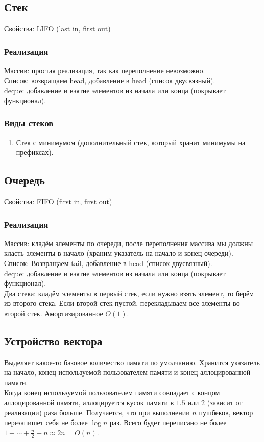 \documentclass[12pt, a4paper]{article}
\begin{document}
    \subsection{Стек}
        Свойства: LIFO (last in, first out)
        \subsubsection*{Реализация}
        Массив: простая реализация, так как переполнение невозможно.\\
        Список: возвращаем head, добавление в head (список двусвязный).\\
        deque: добавление и взятие элементов из начала или конца (покрывает функционал).
        \subsubsection*{Виды стеков}
        \begin{enumerate}
            \item Стек с минимумом (дополнительный стек, который хранит минимумы на префиксах).
        \end{enumerate}
    \subsection{Очередь}
        Свойства: FIFO (first in, first out)
        \subsubsection*{Реализация}
        Массив: кладём элементы по очереди, после переполнения массива мы должны класть элементы в начало (храним указатель на начало и конец очереди).\\
        Список: Возвращаем tail, добавление в head (список двусвязный).\\
        deque: добавление и взятие элементов из начала или конца (покрывает функционал).\\
        Два стека: кладём элементы в первый стек, если нужно взять элемент, то берём из второго стека. Если второй стек пустой, перекладываем все элементы во второй стек. Амортизированное $O (1)$.
    \subsection{Устройство вектора}
        Выделяет какое-то базовое количество памяти по умолчанию. Хранится указатель на начало, конец используемой пользователем памяти и конец аллоцированной памяти.\\
        Когда конец используемой пользователем памяти совпадает с концом аллоцированной памяти, аллоцируется кусок памяти 
        в $1.5$ или $2$ (зависит от реализации) раза больше. Получается, что при выполнении $n$ пушбеков, вектор перезапишет себя 
        не более $\log n$ раз. Всего будет переписано не более $1 + \cdots + \frac{n}{2} + n \approx 2n = O(n)$.
\end{document}
